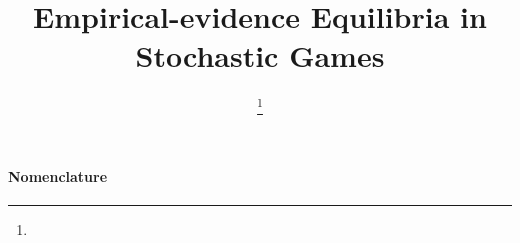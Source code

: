 \documentclass{ieeecdc}
\title{Empirical-evidence Equilibria in Stochastic Games}
\author{\nicolas \and \jeff \thanks{\sponsorsinfo} \affiliation{\authorsinfo}}
\begin{document}
\maketitle

\begin{abstract}

\end{abstract}
\medskip

\paragraph*{Nomenclature}



\end{document}
